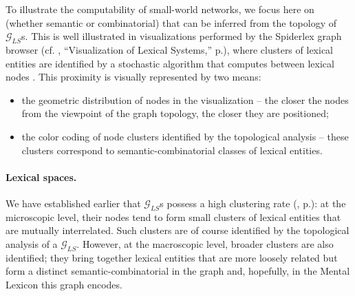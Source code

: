 To illustrate the computability of small-world networks, we focus here on  (whether semantic or combinatorial) that can be inferred from the topology of $\mathcal{G}_{LS}$s. This is well illustrated in visualizations performed by the Spiderlex graph browser (cf. , ``Visualization of Lexical Systems,'' p.\thinspace\pageref{rem:visualizationLS}), where clusters of lexical entities are identified by a stochastic algorithm that computes  between lexical nodes \parencite{Gaume2004,Gaume2008}. This proximity is visually represented by two means: 

\begin{itemize}

\item the geometric distribution of nodes in the visualization -- the closer the nodes from the viewpoint of the graph topology, the closer they are positioned;

\item the color coding of node clusters identified by the topological analysis -- these clusters correspond to semantic-combinatorial classes of lexical entities.

\end{itemize}

\paragraph*{Lexical spaces.}\label{par:lexicalSpaces}

We have established earlier that $\mathcal{G}_{LS}$s possess a high clustering rate (, p.\thinspace\pageref{par:highClusteringRate}): at the microscopic level, their nodes tend to form small clusters of lexical entities that are mutually interrelated. Such clusters are of course identified by the topological analysis of a $\mathcal{G}_{LS}$. However, at the macroscopic level, broader clusters are also identified; they bring together lexical entities that are more loosely related but form a distinct semantic-combinatorial  in the graph and, hopefully, in the Mental Lexicon this graph encodes.

